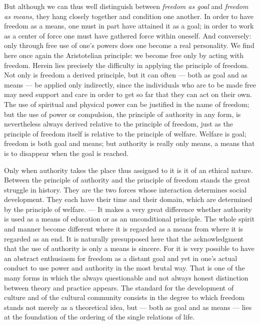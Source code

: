 \documentclass[12pt,a4paper,openany]{book}
\newcommand{\opage}[1]{\marginnote{\footnotesize\textit{[#1]}}}
\begin{document}
But although we can thus well distinguish between \textit{freedom as goal} and \textit{freedom as means,} they hang
closely together and condition one another. In order to have freedom as a means, one must in part have attained it as a
goal; in order to work as a center of force one must have gathered force within oneself. And conversely: only through
free use of one's powers does one become a real personality. We find here once again the Aristotelian principle: we
become free only by acting with freedom. Herein lies precisely the difficulty in applying the principle of freedom. Not
only is freedom a derived principle, but it can often --- both as goal and as means --- be applied only indirectly,
since the individuals who are to be made free may need support and care in order to get so far that they can act on
their own. The use of spiritual and physical power can be justified in the name of freedom; but the use of power or
compulsion, the principle of authority in any form, is nevertheless always derived relative to the principle of freedom,
just as the principle of freedom itself is relative to the principle of welfare. Welfare is goal; freedom is both goal
and means; but authority is really only means, a means that is to disappear when the goal is reached.

Only when authority takes the place thus assigned to it is it of an ethical nature. Between the principle of authority
and the principle of freedom stands the great struggle in history. They are the two forces whose interaction determines
social development. They each have their time and their domain, which are determined by the principle of welfare. --- It
makes a very great difference whether authority is used as a means of education or as an unconditional principle. The
whole spirit and manner become different where it is regarded as a means from where it is regarded as an end. It is
naturally presupposed here that the acknowledgment that the use of authority is only a means is sincere. For it is very
possible to have an abstract enthusiasm for freedom as a distant goal and yet in
\opage{346}one's actual conduct to use power and authority in the most brutal way. That is one of the many forms in
which the always questionable and not always honest distinction between theory and practice appears. The standard for
the development of culture and of the cultural community consists in the degree to which freedom stands not merely as a
theoretical idea, but --- both as goal and as means --- lies at the foundation of the ordering of the single relations of
life.
\end{document}
